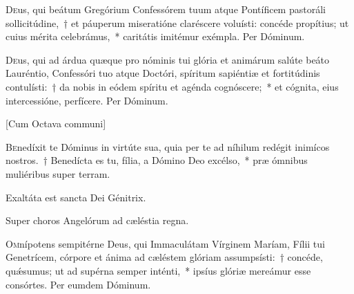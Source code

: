 \documentclass[vesperale_romanum.tex]{subfiles}
\begin{document}
 
 \oratio
\lettrine{D}{e}us, qui beátum Gregórium Confessórem tuum atque Pontíficem pastoráli sollicitúdine,~† et páuperum miseratióne claréscere voluísti: concéde propítius; ut cuius mérita celebrámus,~* caritátis imitémur exémpla.
Per Dóminum.

 

 
\oratio

\lettrine{D}{e}us, qui ad árdua quæque pro nóminis tui glória et animárum salúte beáto Lauréntio, Confessóri tuo atque Doctóri, spíritum sapiéntiæ et fortitúdinis contulísti:~† da nobis in eódem spíritu et agénda cognóscere;~* et cógnita, eius intercessióne, perfícere. Per Dóminum.

\newpage
{}

[Cum Octava communi]



\lettrine{B}{e}nedíxit te Dóminus in virtúte sua, quia per te ad níhilum redégit inimícos nostros.~† Benedícta es tu, fília, a Dómino Deo excélso,~* præ ómnibus muliéribus super terram.


\hymnus


\vv Exaltáta est sancta Dei Génitrix.

\rr Super choros Angelórum ad cæléstia regna.

\oratio

\lettrine{O}{m}nípotens sempitérne Deus, qui Immaculátam Vírginem Maríam, Fílii tui Genetrícem, córpore et ánima ad cæléstem glóriam assumpsísti:~† concéde, quǽsumus; ut ad supérna semper inténti,~* ipsíus glóriæ mereámur esse consórtes. Per eumdem Dóminum.
 

\end{document}
